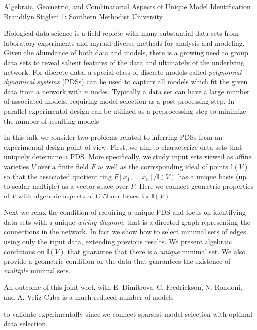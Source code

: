 \begin{addmargin}[2em]{0em}
\vspace{1.5ex}
\abs
{Algebraic, Geometric, and Combinatorial Aspects of Unique Model Identification}
{Brandilyn Stigler$^{1}$}
{1: Southern Methodist University}
{Biological data science is a field replete with many substantial data sets from laboratory experiments and myriad diverse methods for analysis and modeling.  Given the abundance of both data and models, there is a growing need to group data sets to reveal salient features of the data and ultimately of the underlying network.   For discrete data, a special class of discrete models called \emph{polynomial dynamical systems} (PDSs) can be used to capture all models which fit the given data from a network with $n$ nodes.  Typically a data set can have a large number of associated models, requiring model selection as a post-processing step.  In parallel experimental design can be utilized as a preprocessing step to minimize the number of resulting models

In this talk we consider two problems related to inferring PDSs from an experimental design point of view.  First, we aim to characterize data sets that uniquely determine a PDS.  More specifically, we study input sets viewed as affine varieties $V$ over a finite field $F$ as well as the corresponding ideal of points $\mathbb I(V)$ so that the associated quotient ring $F[x_1,\ldots,x_n]/\mathbb I(V)$ has a unique basis (up to scalar multiple) as a vector space over $F$.  Here we connect geometric properties of $V$ with algebraic aspects of Gr\"obner bases for $\mathbb I(V)$.

Next we relax the condition of requiring a unique PDS and focus on identifying data sets with a unique \emph{wiring diagram}, that is a directed graph representing the connections in the network.  In fact we show how to select minimal sets of edges using only the input data, extending previous results. We present algebraic conditions on $\mathbb I(V)$ that guarantee that there is a \emph{unique} minimal set.  We also provide a geometric condition on the data that guarantees the existence of \emph{multiple} minimal sets.

An outcome of this joint work with E. Dimitrova, C. Fredrickson, N. Rondoni, and A. Veliz-Cuba is a much-reduced number of models

to validate experimentally since we connect sparsest model selection with optimal data selection.}



\end{addmargin}
